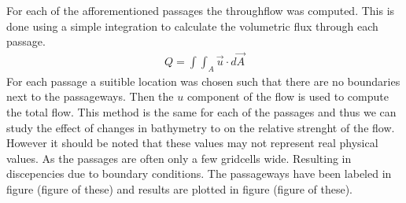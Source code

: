For each of the afforementioned passages the throughflow was computed. This is done using a simple integration to calculate the volumetric flux through each passage.
\begin{align}
	Q = \int \int_A \vec{u} \cdot d\vec{A}
\end{align}	
For each passage a suitible location was chosen such that there are no boundaries next to the passageways. Then the $u$ component of the flow is used to compute the total flow. This method is the same for each of the passages and thus we can study the effect of changes in bathymetry to on the relative strenght of the flow. However it should be noted that these values may not represent real physical values. As the passages are often only a few gridcells wide. Resulting in discepencies due to boundary conditions. The passageways have been labeled in figure (figure of these) and results are plotted in figure (figure of these).